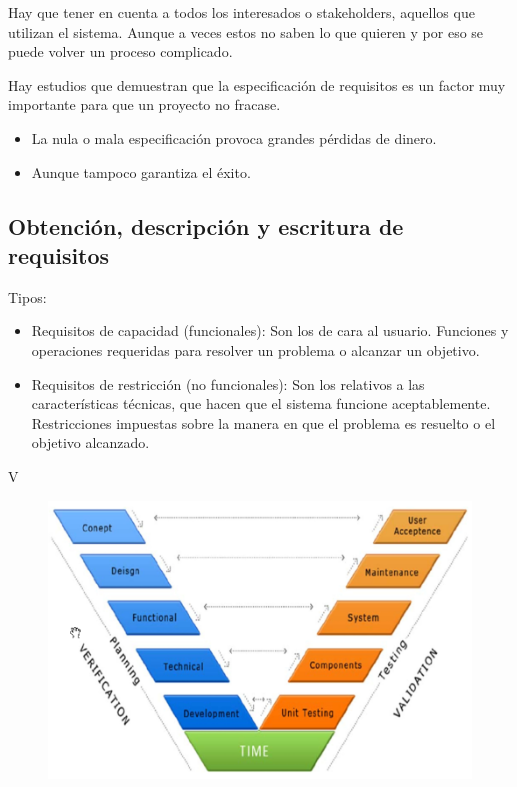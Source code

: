 \documentclass[12pt, twoside, openright]{report} %
\begin{document}
Hay que tener en cuenta a todos los interesados o stakeholders,
aquellos que utilizan el sistema. Aunque a veces estos no saben lo
que quieren y por eso se puede volver un proceso complicado.
\pagebreak

Hay estudios que demuestran que la especificación de requisitos es
un factor muy importante para que un proyecto no fracase.

\begin{itemize}

\item
	La nula o mala especificación provoca grandes pérdidas de dinero.
\item
	Aunque tampoco garantiza el éxito.
\end{itemize}

\subsection{Obtención, descripción y escritura de requisitos}

    Tipos:
    \begin{itemize}
		\item
		Requisitos de capacidad (funcionales): Son los de cara al usuario.
		Funciones y operaciones requeridas para resolver un problema o
		alcanzar un objetivo.
		\item
		Requisitos de restricción (no funcionales): Son los relativos a
		las características técnicas, que hacen que el sistema funcione
		aceptablemente. Restricciones impuestas sobre la manera en que el
		problema es resuelto o el objetivo alcanzado.
    \end{itemize}

	V
	\begin{figure}[H]
		{\includegraphics[scale=.3]{Untitled.png}}
	\end{figure}
\end{document}
